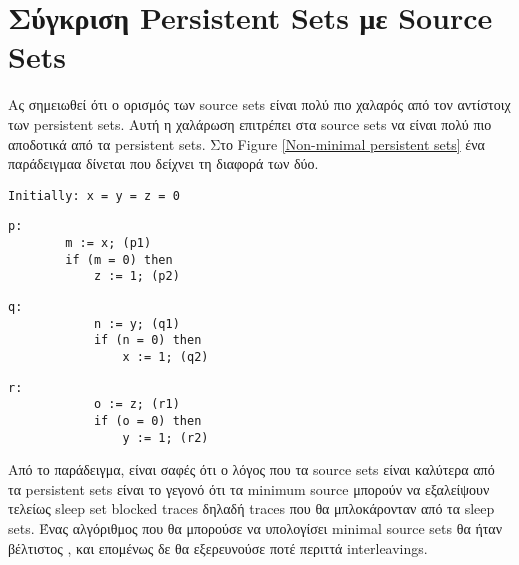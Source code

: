 
\section{Σύγκριση Persistent Sets με Source Sets}

Ας σημειωθεί ότι ο ορισμός των source sets είναι πολύ πιο χαλαρός από τον αντίστοιχ των persistent sets. 
Αυτή η χαλάρωση επιτρέπει στα source sets να είναι πολύ πιο αποδοτικά από τα persistent sets. Στο Figure \ref{Non-minimal persistent sets}
ένα παράδειγμαα δίνεται που δείχνει τη διαφορά των δύο.

\begin{figure*}
    \begin{lstlisting}[frame=none,numbers=none]
        Initially: x = y = z = 0 
    \end{lstlisting}
    \begin{minipage}{0.3\textwidth}
      \begin{lstlisting}[frame=none, numbers=none]
        p:
        m := x; (p1)
        if (m = 0) then
            z := 1; (p2)
      \end{lstlisting}
    \end{minipage}
    \begin{minipage}{0.3\textwidth}
        \begin{lstlisting}[frame=none, numbers=none]
            q:
            n := y; (q1)
            if (n = 0) then
                x := 1; (q2)
        \end{lstlisting}
      \end{minipage}
      \begin{minipage}{0.3\textwidth}
        \begin{lstlisting}[frame=none, numbers=none]
            r:
            o := z; (r1)
            if (o = 0) then
                y := 1; (r2)
        \end{lstlisting}
      \end{minipage}
      \caption{Program with non-minimal persistent sets}
      \label{Non-minimal persistent sets}
  \end{figure*}

Από το παράδειγμα, είναι σαφές ότι ο λόγος που τα source sets είναι καλύτερα από τα persistent sets είναι το γεγονό ότι τα minimum source μπορούν να εξαλείψουν τελείως
sleep set blocked traces δηλαδή traces που θα μπλοκάρονταν από τα sleep sets. Ένας αλγόριθμος που θα μπορούσε να υπολογίσει minimal source sets θα ήταν βέλτιστος \cite{AbdullaAronisJohnssonSagonasDPOR2014}, και επομένως δε θα εξερευνούσε ποτέ περιττά interleavings.

